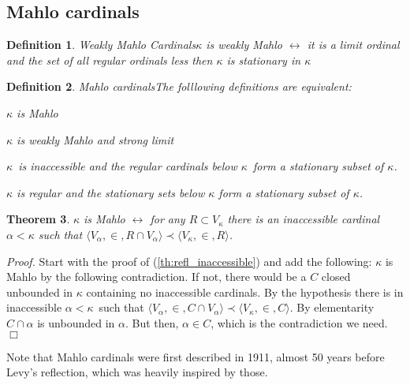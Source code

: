 \documentclass[12pt,a4paper]{article}
\newtheorem{theorem}{Theorem}[section]
\newtheorem{definition}[theorem]{Definition}
\newenvironment{proof}
{\noindent \textit{Proof.}}
{\hspace*{\fill} $\Box$}
\renewcommand{\iff}{\leftrightarrow}
\newcommand{\bce}{\begin{compactenum}}
\newcommand{\ece}{\end{compactenum}}
\begin{document}
%
%
\subsection{Mahlo cardinals}
\begin{definition}{Weakly Mahlo Cardinals}\label{def:weakly_mahlo}
$\kappa$ is \emph{weakly Mahlo} $\iff$ it is a limit ordinal and the set of all regular ordinals less then $\kappa$ is stationary in $\kappa$
\end{definition}

\begin{definition}{Mahlo cardinals}\label{def:mahlo}
The folllowing definitions are equivalent:
\bce[(i)]
\item $\kappa$ is Mahlo
\item $\kappa$ is weakly Mahlo and strong limit
\item $\kappa$ is inaccessible and the regular cardinals below $\kappa$ form a stationary subset of $\kappa$.
\item $\kappa$ is regular and the stationary sets below $\kappa$ form a stationary subset of $\kappa$.
\ece
\end{definition}

\begin{theorem}\label{th:refl_mahlo}
$\kappa$ is Mahlo $\iff$ for any $R \subset V_\kappa$ there is an inaccessible cardinal $\alpha < \kappa$ such that $\langle V_\alpha, \in, R \cap V_\alpha \rangle \prec \langle V_\kappa, \in, R \rangle$.
\end{theorem}

\begin{proof}
Start with the proof of (\ref{th:refl_inaccessible}) and add the following:\newline
$\kappa$ is Mahlo by the following contradiction. If not, there would be a $C$ closed unbounded in $\kappa$ containing no inaccessible cardinals. By the hypothesis there is in inaccessible $\alpha < \kappa$ such that $\langle V_\alpha, \in, C \cap V_\alpha \rangle \prec \langle V_\kappa, \in, C \rangle$. By elementarity $C \cap \alpha$ is unbounded in $\alpha$. But then, $\alpha \in C$, which is the contradiction we need.
\end{proof}

Note that Mahlo cardinals were first described in 1911, almost 50 years before Levy's reflection, which was heavily inspired by those. %
\end{document}
